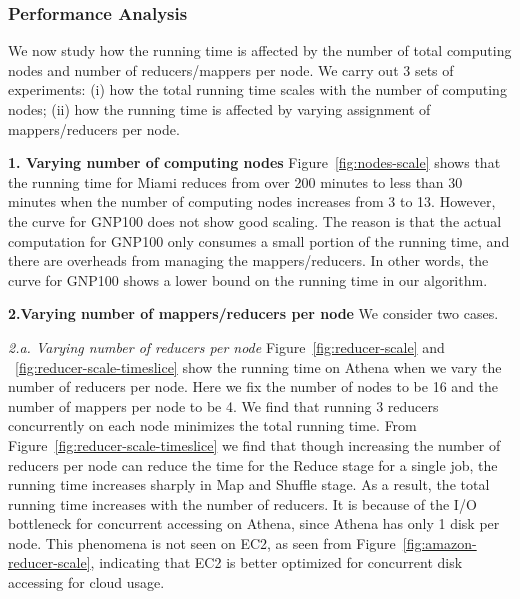 \subsubsection{Performance Analysis}
\label{sec:perf}

We now study how the running time is affected by the number of total computing
nodes and number of reducers/mappers per node. We carry out 3 sets of
experiments: (i) how the total running time scales with the number of computing
nodes; (ii) how the running time is affected by varying assignment of
mappers/reducers per node.

\smallskip
\textbf{1. Varying number of computing nodes}
Figure~\ref{fig:nodes-scale} shows that the running time for Miami
reduces from over 200 minutes to less than 30 minutes when the number of
computing nodes increases from 3 to 13. However, the curve for GNP100 does not
show good scaling. The reason is that the actual computation for GNP100 only
consumes a small portion of the running time, and there are overheads from
managing the mappers/reducers. In other words, the curve for GNP100 shows a
lower bound on the running time in our algorithm.

\smallskip
\textbf{2.Varying number of mappers/reducers per node}
We consider two cases.

\smallskip
\textit{2.a. Varying number of reducers per node}
Figure~\ref{fig:reducer-scale} and
~\ref{fig:reducer-scale-timeslice} show the running time on Athena when we vary
the number of reducers per node. Here we fix the number of nodes to be 16 and
the number of mappers per node to be 4. We find that running $3$ reducers
concurrently on each node minimizes the total running time. From Figure~\ref{fig:reducer-scale-timeslice}
we find that though increasing the number of
reducers per node can reduce the time for the Reduce stage for a single job,
the running time increases sharply in Map and Shuffle stage. As a result,
the total running time increases with the number of reducers. It is because
of the I/O bottleneck for concurrent accessing on Athena, since Athena has only
1 disk per node. This phenomena is not seen on EC2, as seen from
Figure~\ref{fig:amazon-reducer-scale}, indicating that EC2 is
better optimized for  concurrent disk accessing for cloud usage.

